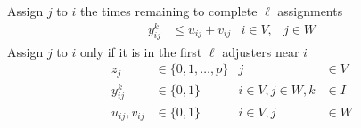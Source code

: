 Assign $j$ to $i$
the times remaining to complete $\ell$ assignments
\begin{align}
  y_{ij}^{k}
  & \leq u_{ij}
  + v_{ij}
  & i \in V,
  & j \in W
\end{align}
Assign $j$ to $i$
only if
it is in the first $\ell$ adjusters near $i$
\begin{align}
  z_j
  & \in \{0,1,\ldots,p\}
  & j
  & \in V \nonumber
  \\
  y_{ij}^{k} 
  & \in \{0,1\}
  & i\in V,j\in W,k
  & \in I \nonumber
  \\
  u_{ij},v_{ij}
  & \in \{0,1\}
  & i \in V,j
  & \in W \nonumber
\end{align}
